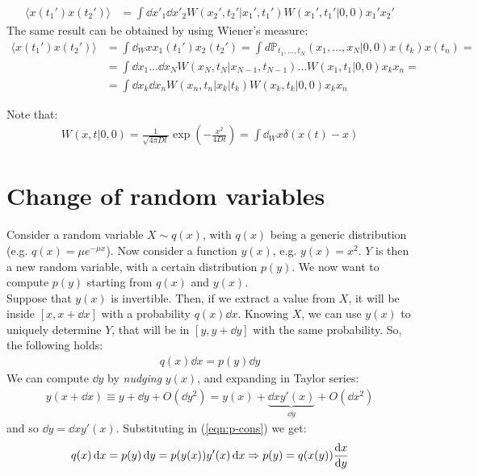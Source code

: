 \documentclass[../template.tex]{subfiles}
\begin{document}
\begin{example}
    \begin{align*}
        \langle x(t_1')x(t_2') \rangle &= \int \dd{x'_1} \dd{x'_2} W(x_2', t_2'|x_1',t_1')W(x_1',t_1'|0,0)x_1' x_2'
    \end{align*}
    The same result can be obtained by using Wiener's measure:
    \begin{align*}
        \langle x(t_1') x(t_2') \rangle&= \int \dd{_Wx} x_1(t_1')x_2(t_2') = \int d\mathbb{P}_{t_1,\dots, t_N} (x_1, \dots, x_N|0,0) x(t_k)x(t_n) =\\
        &= \int \dd{x_1}\dots \dd{x_N} W(x_N,t_N|x_{N-1},t_{N-1}) \dots W(x_1, t_1|0,0) x_k x_n =\\
        &= \int \dd{x_k} \dd{x_n} W(x_n,t_n|x_k|t_k) W(x_k,t_k|0,0) x_k x_n
    \end{align*}
\end{example}
Note that:
\begin{align*}
    W(x,t|0,0) = \frac{1}{\sqrt{4\pi D t}} \exp\left(-\frac{x^2}{4 D t} \right) = \int \dd{_W x} \delta(x(t)-x)
\end{align*}

\section{Change of random variables}
Consider a random variable $X \sim q(x)$, with $q(x)$ being a generic distribution (e.g. $q(x) = \mu e^{-\mu x}$). Now consider a function $y(x)$, e.g. $y(x) = x^2$. $Y$ is then a new random variable, with a certain distribution $p(y)$. We now want to compute $p(y)$ starting from $q(x)$ and $y(x)$.\\
Suppose that $y(x)$ is invertible. Then, if we extract a value from $X$, it will be inside $[x,x+\dd{x}]$ with a probability $q(x) \dd{x}$. Knowing $X$, we can use $y(x)$ to uniquely determine $Y$, that will be in $[y,y+\dd{y}]$ with the same probability. So, the following holds:
\begin{align}
    q(x) \dd{x} = p(y) \dd{y}
    \label{eqn:p-cons}
\end{align}        
We can compute $\dd{y}$ by \textit{nudging} $y(x)$, and expanding in Taylor series:  
\begin{align*}
    y(x+\dd{x}) \equiv y + \dd{y} + O(\dd{y}^2) = y(x) + \underbrace{\dd{x} y'(x)}_{\dd{y}} + O(\dd{x}^2) 
\end{align*} 
and so $\dd{y} = \dd{x} y'(x)$. Substituting in (\ref{eqn:p-cons}) we get:
\begin{align*}
    q(x) \dd{x} = p(y)\dd{y} = p(y(x)) y'(x) \dd{x} \Rightarrow p(y) = q(x(y)) \dv{x}{y} (x(y))
\end{align*}  
\end{document}

